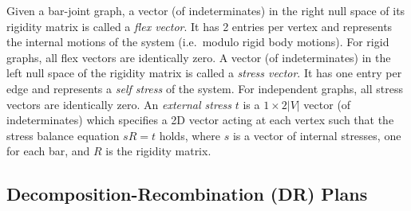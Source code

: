 Given a bar-joint graph, a vector (of indeterminates) in the right null space of its rigidity matrix
is called a {\em flex vector}. 
It has 2 entries per vertex and represents the internal motions of the system
(i.e.\ modulo rigid body motions).
For rigid graphs, all flex vectors are identically zero. 
%
A vector (of indeterminates) in the left null space of the rigidity matrix
is called a {\em stress vector}.
It has one entry per edge and represents a {\em self stress} of the system.
For independent graphs, all stress vectors are identically zero. 
%
An {\em external stress} $t$ is a $1\times 2|V|$ vector  (of indeterminates)
which specifies a 2D vector acting at each vertex
such that the stress balance equation $sR = t$ holds, where $s$ is a vector
of internal stresses, one for each bar, and $R$ is the rigidity matrix.












\subsection{Decomposition-Recombination (DR) Plans}


%
%
%
%
%
%


